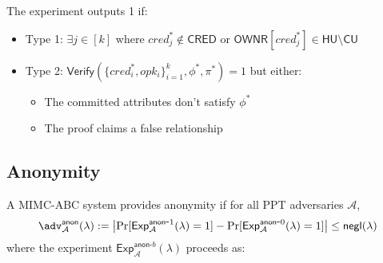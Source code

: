 The experiment outputs 1 if:
\begin{itemize}
    \item Type 1: $\exists j \in [k]$ where $cred^*_j \notin \mathsf{CRED}$ or $\mathsf{OWNR}[cred^*_j] \in \mathsf{HU} \setminus \mathsf{CU}$
    \item Type 2: $\mathsf{Verify}(\{cred^*_i, opk_i\}_{i=1}^k, \phi^*, \pi^*) = 1$ but either:
    \begin{itemize}
        \item The committed attributes don't satisfy $\phi^*$
        \item The proof claims a false relationship
    \end{itemize}
\end{itemize}
















\newpage
\subsection{Anonymity} 

\begin{definition}
A MIMC-ABC system provides anonymity if for all PPT adversaries $\mathcal{A}$,
\[
\adv^{\mathsf{anon}}_{\mathcal{A}}(\lambda) := \left|\Pr[\mathsf{Exp}^{\mathsf{anon}\mbox{-}1}_{\mathcal{A}}(\lambda)=1] - \Pr[\mathsf{Exp}^{\mathsf{anon}\mbox{-}0}_{\mathcal{A}}(\lambda)=1]\right| \leq \negl
\]
where the experiment $\mathsf{Exp}^{\mathsf{anon}\mbox{-}b}_{\mathcal{A}}(\lambda)$ proceeds as:
\end{definition}

